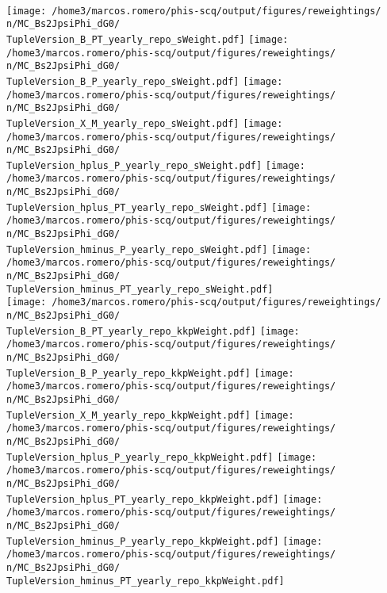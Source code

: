 {\begin{frame}
\vspace*{0.25cm}
\\[0.15cm]
  \texttt{[image: /home3/marcos.romero/phis-scq/output/figures/reweightings/\\n/MC\_Bs2JpsiPhi\_dG0/\\TupleVersion\_B\_PT\_yearly\_repo\_sWeight.pdf]}
  \texttt{[image: /home3/marcos.romero/phis-scq/output/figures/reweightings/\\n/MC\_Bs2JpsiPhi\_dG0/\\TupleVersion\_B\_P\_yearly\_repo\_sWeight.pdf]}
  \texttt{[image: /home3/marcos.romero/phis-scq/output/figures/reweightings/\\n/MC\_Bs2JpsiPhi\_dG0/\\TupleVersion\_X\_M\_yearly\_repo\_sWeight.pdf]}
  \texttt{[image: /home3/marcos.romero/phis-scq/output/figures/reweightings/\\n/MC\_Bs2JpsiPhi\_dG0/\\TupleVersion\_hplus\_P\_yearly\_repo\_sWeight.pdf]}
  \texttt{[image: /home3/marcos.romero/phis-scq/output/figures/reweightings/\\n/MC\_Bs2JpsiPhi\_dG0/\\TupleVersion\_hplus\_PT\_yearly\_repo\_sWeight.pdf]}
  \texttt{[image: /home3/marcos.romero/phis-scq/output/figures/reweightings/\\n/MC\_Bs2JpsiPhi\_dG0/\\TupleVersion\_hminus\_P\_yearly\_repo\_sWeight.pdf]}
  \texttt{[image: /home3/marcos.romero/phis-scq/output/figures/reweightings/\\n/MC\_Bs2JpsiPhi\_dG0/\\TupleVersion\_hminus\_PT\_yearly\_repo\_sWeight.pdf]}
\\[0.15cm]
  \texttt{[image: /home3/marcos.romero/phis-scq/output/figures/reweightings/\\n/MC\_Bs2JpsiPhi\_dG0/\\TupleVersion\_B\_PT\_yearly\_repo\_kkpWeight.pdf]}
  \texttt{[image: /home3/marcos.romero/phis-scq/output/figures/reweightings/\\n/MC\_Bs2JpsiPhi\_dG0/\\TupleVersion\_B\_P\_yearly\_repo\_kkpWeight.pdf]}
  \texttt{[image: /home3/marcos.romero/phis-scq/output/figures/reweightings/\\n/MC\_Bs2JpsiPhi\_dG0/\\TupleVersion\_X\_M\_yearly\_repo\_kkpWeight.pdf]}
  \texttt{[image: /home3/marcos.romero/phis-scq/output/figures/reweightings/\\n/MC\_Bs2JpsiPhi\_dG0/\\TupleVersion\_hplus\_P\_yearly\_repo\_kkpWeight.pdf]}
  \texttt{[image: /home3/marcos.romero/phis-scq/output/figures/reweightings/\\n/MC\_Bs2JpsiPhi\_dG0/\\TupleVersion\_hplus\_PT\_yearly\_repo\_kkpWeight.pdf]}
  \texttt{[image: /home3/marcos.romero/phis-scq/output/figures/reweightings/\\n/MC\_Bs2JpsiPhi\_dG0/\\TupleVersion\_hminus\_P\_yearly\_repo\_kkpWeight.pdf]}
  \texttt{[image: /home3/marcos.romero/phis-scq/output/figures/reweightings/\\n/MC\_Bs2JpsiPhi\_dG0/\\TupleVersion\_hminus\_PT\_yearly\_repo\_kkpWeight.pdf]}
\end{frame} %
%
}


